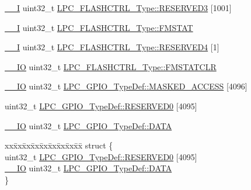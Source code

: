 \begin{DoxyCompactItemize}
\hyperlink{group___c_m_s_i_s__core__definitions_gaf63697ed9952cc71e1225efe205f6cd3}{\+\_\+\+\_\+I} uint32\+\_\+t \hyperlink{group___l_p_c11xx___definitions_ga5c05e98fac013cde1a119a3e91dde5d4}{L\+P\+C\+\_\+\+F\+L\+A\+S\+H\+C\+T\+R\+L\+\_\+\+Type\+::\+R\+E\+S\+E\+R\+V\+E\+D3} \mbox{[}1001\mbox{]}
\item 
\hyperlink{group___c_m_s_i_s__core__definitions_gaf63697ed9952cc71e1225efe205f6cd3}{\+\_\+\+\_\+I} uint32\+\_\+t \hyperlink{group___l_p_c11xx___definitions_gac196f302787ff85c055a02a32fae86d6}{L\+P\+C\+\_\+\+F\+L\+A\+S\+H\+C\+T\+R\+L\+\_\+\+Type\+::\+F\+M\+S\+T\+AT}
\item 
\hyperlink{group___c_m_s_i_s__core__definitions_gaf63697ed9952cc71e1225efe205f6cd3}{\+\_\+\+\_\+I} uint32\+\_\+t \hyperlink{group___l_p_c11xx___definitions_ga01c56664dd38ea6e92198855afc93af3}{L\+P\+C\+\_\+\+F\+L\+A\+S\+H\+C\+T\+R\+L\+\_\+\+Type\+::\+R\+E\+S\+E\+R\+V\+E\+D4} \mbox{[}1\mbox{]}
\item 
\hyperlink{group___c_m_s_i_s__core__definitions_gaec43007d9998a0a0e01faede4133d6be}{\+\_\+\+\_\+\+IO} uint32\+\_\+t \hyperlink{group___l_p_c11xx___definitions_gaf55332ea67635bc3c2cad7d51a9478f6}{L\+P\+C\+\_\+\+F\+L\+A\+S\+H\+C\+T\+R\+L\+\_\+\+Type\+::\+F\+M\+S\+T\+A\+T\+C\+LR}
\item 
\hyperlink{group___c_m_s_i_s__core__definitions_gaec43007d9998a0a0e01faede4133d6be}{\+\_\+\+\_\+\+IO} uint32\+\_\+t \hyperlink{group___l_p_c11xx___definitions_ga42131a82621eb8fd5f55365654dabdba}{L\+P\+C\+\_\+\+G\+P\+I\+O\+\_\+\+Type\+Def\+::\+M\+A\+S\+K\+E\+D\+\_\+\+A\+C\+C\+E\+SS} \mbox{[}4096\mbox{]}
\item 
uint32\+\_\+t \hyperlink{group___l_p_c11xx___definitions_gaea82533d430cb89b9623ac026edc2517}{L\+P\+C\+\_\+\+G\+P\+I\+O\+\_\+\+Type\+Def\+::\+R\+E\+S\+E\+R\+V\+E\+D0} \mbox{[}4095\mbox{]}
\item 
\hyperlink{group___c_m_s_i_s__core__definitions_gaec43007d9998a0a0e01faede4133d6be}{\+\_\+\+\_\+\+IO} uint32\+\_\+t \hyperlink{group___l_p_c11xx___definitions_gaef9bb9639cb3af843526756c06ff763e}{L\+P\+C\+\_\+\+G\+P\+I\+O\+\_\+\+Type\+Def\+::\+D\+A\+TA}
\item 
\begin{tabbing}
xx\=xx\=xx\=xx\=xx\=xx\=xx\=xx\=xx\=\kill
struct \{\\
\>uint32\_t \hyperlink{group___l_p_c11xx___definitions_gaea82533d430cb89b9623ac026edc2517}{LPC\_GPIO\_TypeDef::RESERVED0} \mbox{[}4095\mbox{]}\\
\>\hyperlink{group___c_m_s_i_s__core__definitions_gaec43007d9998a0a0e01faede4133d6be}{\_\_IO} uint32\_t \hyperlink{group___l_p_c11xx___definitions_gaef9bb9639cb3af843526756c06ff763e}{LPC\_GPIO\_TypeDef::DATA}\\
\} \\


\end{tabbing}
\end{DoxyCompactItemize}
